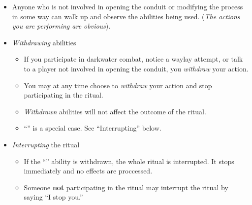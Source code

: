 \documentclass[green]{elementals}
\begin{document}
\begin{itemize}
  \item Anyone who is not involved in opening the conduit or modifying the process in some way can walk up and observe the abilities being used. (\emph{The actions you are performing are obvious}).
  \item \emph{Withdrawing} abilities
  \begin{itemize}
  	\item If you participate in darkwater combat, notice a waylay attempt, or talk to a player not involved in opening the conduit, you \emph{withdraw} your action.
  	\item You may at any time choose to \emph{withdraw} your action and stop participating in the ritual. 
  	\item \emph{Withdrawn} abilities will not affect the outcome of the ritual.
  	\item ``\aWorkConduit{}'' is a special case. See ``Interrupting'' below.
  \end{itemize}
  \item \emph{Interrupting} the ritual
  \begin{itemize}
  	\item If the ``\aWorkConduit{}'' ability is withdrawn, the whole ritual is interrupted. It stops immediately and no effects are proccessed.
  	\item Someone {\bf not} participating in the ritual may interrupt the ritual by saying ``I stop you.''
  \end{itemize}
\end{itemize}
\end{document}
